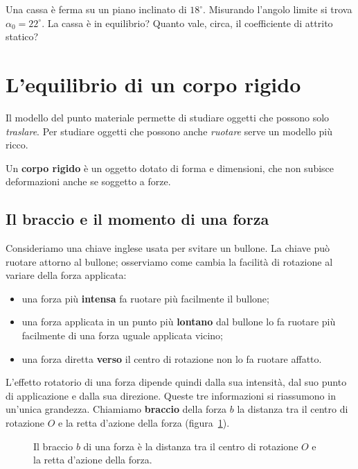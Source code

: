 \begin{esercizio}
Una cassa è ferma su un piano inclinato di $18^\circ$. Misurando l'angolo limite si trova $\alpha_0 = 22^\circ$. La cassa è in equilibrio? Quanto vale, circa, il coefficiente di attrito statico?\\
\end{esercizio}


\section{L'equilibrio di un corpo rigido}

Il modello del punto materiale permette di studiare oggetti che possono solo \emph{traslare}. Per studiare oggetti che possono anche \emph{ruotare} serve un modello più ricco.

\begin{definizione}
Un \textbf{corpo rigido} è un oggetto dotato di forma e dimensioni, che non subisce deformazioni anche se soggetto a forze.
\end{definizione}

\subsection{Il braccio e il momento di una forza}
Consideriamo una chiave inglese usata per svitare un bullone. La chiave può ruotare attorno al bullone; osserviamo come cambia la facilità di rotazione al variare della forza applicata:
\begin{itemize}
\item una forza più \textbf{intensa} fa ruotare più facilmente il bullone;
\item una forza applicata in un punto più \textbf{lontano} dal bullone lo fa ruotare più facilmente di una forza uguale applicata vicino;
\item una forza diretta \textbf{verso} il centro di rotazione non lo fa ruotare affatto.
\end{itemize}
L'effetto rotatorio di una forza dipende quindi dalla sua intensità, dal suo punto di applicazione e dalla sua direzione. Queste tre informazioni si riassumono in un'unica grandezza. Chiamiamo \textbf{braccio} della forza $b$ la distanza tra il centro di rotazione $O$ e la retta d'azione della forza (figura~\ref{fig:momento}).

\begin{figure}[h!]
\centering
{}
\caption{Il braccio $b$ di una forza è la distanza tra il centro di rotazione $O$ e la retta d'azione della forza.}
\label{fig:momento}
\end{figure}

